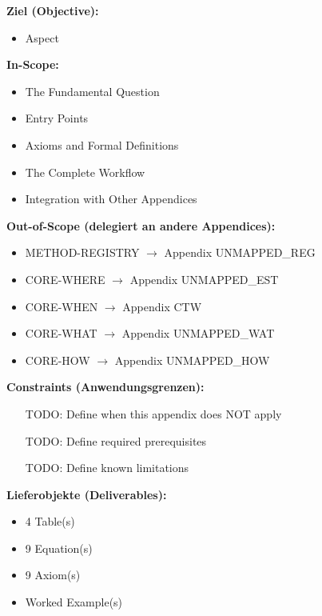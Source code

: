 \begin{tcolorbox}[
    colback=orange!5!white,
    colframe=orange!75!black,
    title={\textbf{Appendix Scope: Ziel / In-Scope / Out-of-Scope / Constraints}},
    fonttitle=\bfseries
]

\textbf{Ziel (Objective):}
\begin{itemize}[nosep]
    \item Aspect
\end{itemize}

\textbf{In-Scope:}
\begin{itemize}[nosep]
    \item The Fundamental Question
    \item Entry Points
    \item Axioms and Formal Definitions
    \item The Complete Workflow
    \item Integration with Other Appendices
\end{itemize}

\textbf{Out-of-Scope (delegiert an andere Appendices):}
\begin{itemize}[nosep]
    \item METHOD-REGISTRY $\rightarrow$ Appendix UNMAPPED_REG
    \item CORE-WHERE $\rightarrow$ Appendix UNMAPPED_EST
    \item CORE-WHEN $\rightarrow$ Appendix CTW
    \item CORE-WHAT $\rightarrow$ Appendix UNMAPPED_WAT
    \item CORE-HOW $\rightarrow$ Appendix UNMAPPED_HOW
\end{itemize}

\textbf{Constraints (Anwendungsgrenzen):}
\begin{itemize}[nosep]
    \item [TODO: Define when this appendix does NOT apply]
    \item [TODO: Define required prerequisites]
    \item [TODO: Define known limitations]
\end{itemize}

\textbf{Lieferobjekte (Deliverables):}
\begin{itemize}[nosep]
    \item 4 Table(s)
    \item 9 Equation(s)
    \item 9 Axiom(s)
    \item Worked Example(s)
\end{itemize}

\end{tcolorbox}





